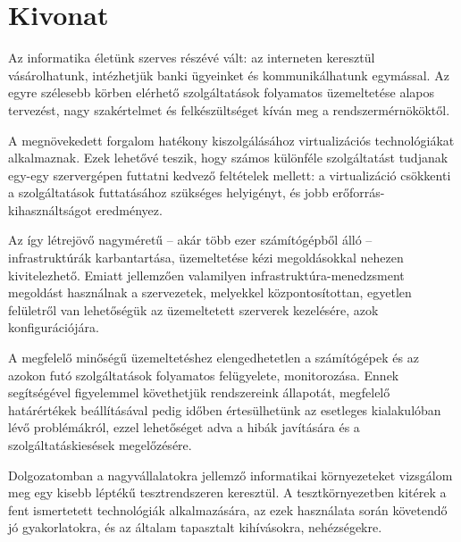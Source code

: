 \setcounter{page}{1}

\selecthungarian

\chapter*{Kivonat}

Az informatika életünk szerves részévé vált: az interneten keresztül vásárolhatunk, intézhetjük banki ügyeinket és kommunikálhatunk egymással. Az egyre szélesebb körben elérhető szolgáltatások folyamatos üzemeltetése alapos tervezést, nagy szakértelmet és felkészültséget kíván meg a rendszermérnököktől.

A megnövekedett forgalom hatékony kiszolgálásához virtualizációs technológiákat alkalmaznak. Ezek lehetővé teszik, hogy számos különféle szolgáltatást tudjanak egy-egy szervergépen futtatni kedvező feltételek mellett: a virtualizáció csökkenti a szolgáltatások futtatásához szükséges helyigényt, és jobb erőforrás-kihasználtságot eredményez.

Az így létrejövő nagyméretű -- akár több ezer számítógépből álló -- infrastruktúrák karbantartása, üzemeltetése kézi megoldásokkal nehezen kivitelezhető. Emiatt jellemzően valamilyen infrastruktúra-menedzsment megoldást használnak a szervezetek, melyekkel központosítottan, egyetlen felületről van lehetőségük az üzemeltetett szerverek kezelésére, azok konfigurációjára.

A megfelelő minőségű üzemeltetéshez elengedhetetlen a számítógépek és az azokon futó szolgáltatások folyamatos felügyelete, monitorozása. Ennek segítségével figyelemmel követhetjük rendszereink állapotát, megfelelő határértékek beállításával pedig időben értesülhetünk az esetleges kialakulóban lévő problémákról, ezzel lehetőséget adva a hibák javítására és a szolgáltatáskiesések megelőzésére.

Dolgozatomban a nagyvállalatokra jellemző informatikai környezeteket vizsgálom meg egy kisebb léptékű tesztrendszeren keresztül. A tesztkörnyezetben kitérek a fent ismertetett technológiák alkalmazására, az ezek használata során követendő jó gyakorlatokra, és az általam tapasztalt kihívásokra, nehézségekre.


\vfill
\selectenglish


